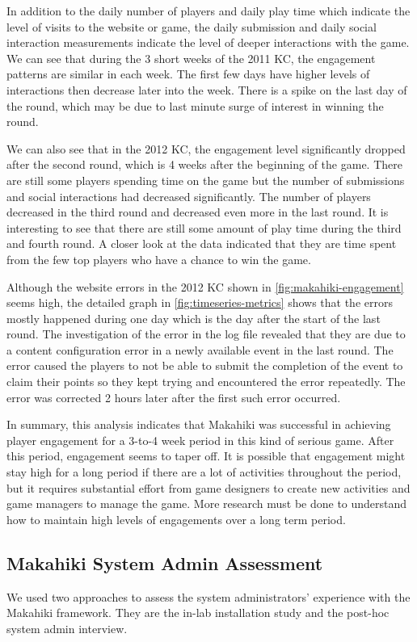 In addition to the daily number of players and daily play time which indicate the level of visits to the website or game, the daily submission and daily social interaction measurements indicate the level of deeper interactions with the game. We can see that during the 3 short weeks of the 2011 KC, the engagement patterns are similar in each week. The first few days have higher levels of interactions then decrease later into the week. There is a spike on the last day of the round, which may be due to last minute surge of interest in winning the round. 

We can also see that in the 2012 KC, the engagement level significantly dropped after the second round, which is 4 weeks after the beginning of the game. There are still some players spending time on the game but the number of submissions and social interactions had decreased significantly. The number of players decreased in the third round and decreased even more in the last round. It is interesting to see that there are still some amount of play time during the third and fourth round. A closer look at the data indicated that they are time spent from the few top players who have a chance to win the game. 

Although the website errors in the 2012 KC shown in \autoref{fig:makahiki-engagement} seems high, the detailed graph in \autoref{fig:timeseries-metrics} shows that the errors mostly happened during one day which is the day after the start of the last round. The investigation of the error in the log file revealed that they are due to a content configuration error in a newly available event in the last round. The error caused the players to not be able to submit the completion of the event to claim their points so they kept trying and encountered the error repeatedly. The error was corrected 2 hours later after the first such error occurred.

In summary, this analysis indicates that Makahiki was successful in achieving player engagement for a 3-to-4 week period in this kind of serious game. After this period, engagement seems to taper off. It is possible that engagement might stay high for a long period if there are a lot of activities throughout the period, but it requires substantial effort from game designers to create new activities and game managers to manage the game. More research must be done to understand how to maintain high levels of engagements over a long term period.

\subsection{Makahiki System Admin Assessment}
We used two approaches to assess the system administrators' experience with the Makahiki framework. They are the in-lab installation study and the post-hoc system admin interview.

